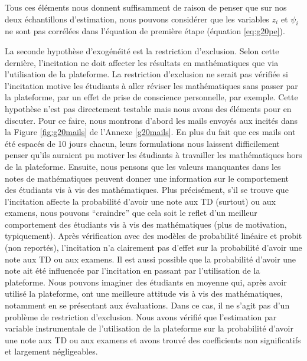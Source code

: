 \documentclass[
]{book}
\begin{document}
Tous ces éléments nous donnent suffisamment de raison de penser que sur nos deux échantillons d'estimation, nous pouvons considérer que les variables \(z_i\) et \(\psi_i\) ne sont pas corrélées dans l'équation de première étape (équation \ref{eq:g20pe}).

\quad La seconde hypothèse d'exogénéité est la restriction d'exclusion. Selon cette dernière, l'incitation ne doit affecter les résultats en mathématiques que via l'utilisation de la plateforme. La restriction d'exclusion ne serait pas vérifiée si l'incitation motive les étudiants à aller réviser les mathématiques sans passer par la plateforme, par un effet de prise de conscience personnelle, par exemple. Cette hypothèse n'est pas directement testable mais nous avons des éléments pour en discuter. Pour ce faire, nous montrons d'abord les mails envoyés aux incités dans la Figure \ref{fig:g20mails} de l'Annexe \ref{g20mails}. En plus du fait que ces mails ont été espacés de 10 jours chacun, leurs formulations nous laissent difficilement penser qu'ils auraient pu motiver les étudiants à travailler les mathématiques hors de la plateforme. Ensuite, nous pensons que les valeurs manquantes dans les notes de mathématiques peuvent donner une information sur le comportement des étudiants vis à vis des mathématiques. Plus précisément, s'il se trouve que l'incitation affecte la probabilité d'avoir une note aux TD (surtout) ou aux examens, nous pouvons ``craindre'' que cela soit le reflet d'un meilleur comportement des étudiants vis à vis des mathématiques (plus de motivation, typiquement). Après vérification avec des modèles de probabilité linéaire et probit (non reportés), l'incitation n'a clairement pas d'effet sur la probabilité d'avoir une note aux TD ou aux examens. Il est aussi possible que la probabilité d'avoir une note ait été influencée par l'incitation en passant par l'utilisation de la plateforme. Nous pouvons imaginer des étudiants en moyenne qui, après avoir utilisé la plateforme, ont une meilleure attitude vis à vis des mathématiques, notamment en se présentant aux évaluations. Dans ce cas, il ne s'agit pas d'un problème de restriction d'exclusion. Nous avons vérifié que l'estimation par variable instrumentale de l'utilisation de la plateforme sur la probabilité d'avoir une note aux TD ou aux examens et avons trouvé des coefficients non significatifs et largement négligeables.
\end{document}
